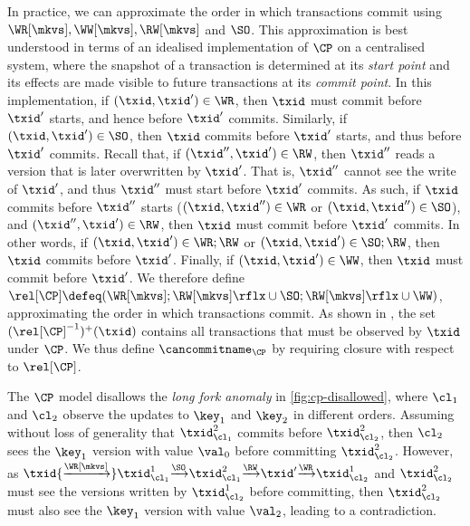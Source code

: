 In practice, we can approximate the order in which transactions 
commit using \(\WR[\mkvs], \allowbreak \WW[\mkvs], \allowbreak \RW[\mkvs]\) and \(\SO\). 
This approximation is best understood in terms of an idealised implementation of \(\CP\) on a centralised system,
where the snapshot of a transaction is determined at its \emph{start point} and its effects are made visible to future transactions at its \emph{commit point}.
In this implementation, if \((\txid,\txid') \in \WR\), then 
\(\txid\) must commit before \(\txid'\) starts, and hence before \(\txid'\) commits.
Similarly, if \((\txid,\txid') \in \SO\), then \(\txid\) commits before \(\txid'\) starts, 
and thus before \(\txid'\) commits.
Recall that, if \((\txid'', \txid') \in \RW\),
then \(\txid''\) reads a version that is later overwritten by \(\txid'\).
That is, \(\txid''\) cannot see the write of \(\txid'\), and thus \(\txid''\) must start before 
\(\txid'\) commits. 
As such, if \(\txid\) commits before \(\txid''\) starts 
(\((\txid, \txid'') \in \WR\) or \((\txid,\txid'') \in \SO\)), 
and \((\txid'', \txid') \in \RW\), then \(\txid\) must commit before 
\(\txid'\) commits. 
In other words, if \((\txid,\txid') \in \WR;\RW\) or \((\txid,\txid') \in \SO;\RW\), then \(\txid\) commits before \(\txid'\).
Finally, if \((\txid,\txid') \in\WW\), then \(\txid\) must commit before \(\txid'\). 
We therefore define \(\rel[\CP] \defeq (\WR[\mkvs]; \RW[\mkvs]\rflx \cup \SO;  \RW[\mkvs]\rflx \cup \WW)\), approximating the order in which transactions commit. 
%
As shown in \citet{laws}, the set \((\rel[\CP]^{-1})^{+}(\txid)\) contains all transactions that must be observed by \(\txid\) under \(\CP\). 
We thus define \(\cancommitname_{\CP}\) by requiring closure with respect to \(\rel[\CP]\).

The $\CP$ model disallows the \emph{long fork anomaly} in \cref{fig:cp-disallowed}, where \(\cl_1\) and \(\cl_2\) observe the updates to \(\key_1\) and \(\key_2\) 
in different orders. 
Assuming without loss of generality that \( \txid_{\cl_1}^{2} \) commits 
before \( \txid_{\cl_2}^{2} \), then \(\cl_2\) sees the \(\key_1\) version with value \(\val_0\) before committing \( \txid_{\cl_2}^{2} \). 
However, as \(\txid {\xrightarrow{\!\WR[\mkvs]\!}} \txid_{\cl_{1}}^{1} 
{\xrightarrow{\!\SO\!}} \txid_{\cl_{1}}^{2} {\xrightarrow{\!\RW\!}} \txid' {\xrightarrow{\!\WR\!}} \txid_{\cl_{2}}^{1} \)
and \( \txid_{\cl_2}^{2} \) must see the versions written by \( \txid_{\cl_2}^{1} \) before committing,
then \( \txid_{\cl_2}^{2} \) must also see the \(\key_1\) version with 
value \(\val_2\), leading to a contradiction.


